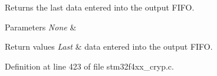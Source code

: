 Returns the last data entered into the output F\-I\-F\-O. 


\begin{DoxyParams}{Parameters}
{\em None} & \\
\hline
\end{DoxyParams}

\begin{DoxyRetVals}{Return values}
{\em Last} & data entered into the output F\-I\-F\-O. \\
\hline
\end{DoxyRetVals}


Definition at line 423 of file stm32f4xx\-\_\-cryp.\-c.


